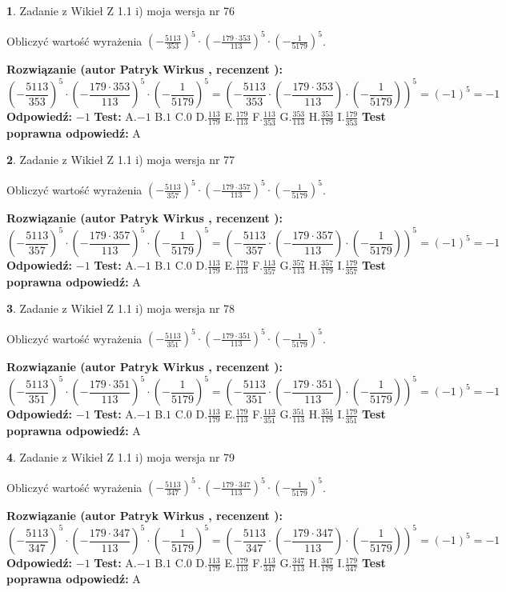 \documentclass[12pt, a4paper]{article}
\theoremstyle{definition} %
\newtheorem{zad}{}
\newcommand{\zadStart}[1]{\begin{zad}#1\newline}
\newcommand{\zadStop}{\end{zad}}
\newcommand{\rozwStart}[2]{\noindent \textbf{Rozwiązanie (autor #1 , recenzent #2): }\newline}
\newcommand{\rozwStop}{\newline}
\newcommand{\odpStart}{\noindent \textbf{Odpowiedź:}\newline}
\newcommand{\odpStop}{\newline}
\newcommand{\testStart}{\noindent \textbf{Test:}\newline}
\newcommand{\testStop}{\newline}
\newcommand{\kluczStart}{\noindent \textbf{Test poprawna odpowiedź:}\newline}
\newcommand{\kluczStop}{\newline}
\begin{document}
\zadStart{Zadanie z Wikieł Z 1.1 i) moja wersja nr 76}

Obliczyć wartość wyrażenia $(-\frac{5113}{353})^{5} \cdot (-\frac{179 \cdot 353}{113})^{5} \cdot (-\frac{1}{5179})^{5}$.
\zadStop
\rozwStart{Patryk Wirkus}{}
$$(-\frac{5113}{353})^{5} \cdot (-\frac{179 \cdot 353}{113})^{5} \cdot (-\frac{1}{5179})^{5} = (-\frac{5113}{353} \cdot (-\frac{179 \cdot 353}{113}) \cdot (-\frac{1}{5179}))^{5} = (-1)^{5} = -1$$
\rozwStop
\odpStart
$-1$
\odpStop
\testStart
A.$-1$ B.$1$ C.$0$ D.$\frac{113}{179}$ E.$\frac{179}{113}$
F.$\frac{113}{353}$ G.$\frac{353}{113}$
H.$\frac{353}{179}$
I.$\frac{179}{353}$
\testStop
\kluczStart
A
\kluczStop



\zadStart{Zadanie z Wikieł Z 1.1 i) moja wersja nr 77}

Obliczyć wartość wyrażenia $(-\frac{5113}{357})^{5} \cdot (-\frac{179 \cdot 357}{113})^{5} \cdot (-\frac{1}{5179})^{5}$.
\zadStop
\rozwStart{Patryk Wirkus}{}
$$(-\frac{5113}{357})^{5} \cdot (-\frac{179 \cdot 357}{113})^{5} \cdot (-\frac{1}{5179})^{5} = (-\frac{5113}{357} \cdot (-\frac{179 \cdot 357}{113}) \cdot (-\frac{1}{5179}))^{5} = (-1)^{5} = -1$$
\rozwStop
\odpStart
$-1$
\odpStop
\testStart
A.$-1$ B.$1$ C.$0$ D.$\frac{113}{179}$ E.$\frac{179}{113}$
F.$\frac{113}{357}$ G.$\frac{357}{113}$
H.$\frac{357}{179}$
I.$\frac{179}{357}$
\testStop
\kluczStart
A
\kluczStop



\zadStart{Zadanie z Wikieł Z 1.1 i) moja wersja nr 78}

Obliczyć wartość wyrażenia $(-\frac{5113}{351})^{5} \cdot (-\frac{179 \cdot 351}{113})^{5} \cdot (-\frac{1}{5179})^{5}$.
\zadStop
\rozwStart{Patryk Wirkus}{}
$$(-\frac{5113}{351})^{5} \cdot (-\frac{179 \cdot 351}{113})^{5} \cdot (-\frac{1}{5179})^{5} = (-\frac{5113}{351} \cdot (-\frac{179 \cdot 351}{113}) \cdot (-\frac{1}{5179}))^{5} = (-1)^{5} = -1$$
\rozwStop
\odpStart
$-1$
\odpStop
\testStart
A.$-1$ B.$1$ C.$0$ D.$\frac{113}{179}$ E.$\frac{179}{113}$
F.$\frac{113}{351}$ G.$\frac{351}{113}$
H.$\frac{351}{179}$
I.$\frac{179}{351}$
\testStop
\kluczStart
A
\kluczStop



\zadStart{Zadanie z Wikieł Z 1.1 i) moja wersja nr 79}

Obliczyć wartość wyrażenia $(-\frac{5113}{347})^{5} \cdot (-\frac{179 \cdot 347}{113})^{5} \cdot (-\frac{1}{5179})^{5}$.
\zadStop
\rozwStart{Patryk Wirkus}{}
$$(-\frac{5113}{347})^{5} \cdot (-\frac{179 \cdot 347}{113})^{5} \cdot (-\frac{1}{5179})^{5} = (-\frac{5113}{347} \cdot (-\frac{179 \cdot 347}{113}) \cdot (-\frac{1}{5179}))^{5} = (-1)^{5} = -1$$
\rozwStop
\odpStart
$-1$
\odpStop
\testStart
A.$-1$ B.$1$ C.$0$ D.$\frac{113}{179}$ E.$\frac{179}{113}$
F.$\frac{113}{347}$ G.$\frac{347}{113}$
H.$\frac{347}{179}$
I.$\frac{179}{347}$
\testStop
\kluczStart
A
\kluczStop
\end{document}
